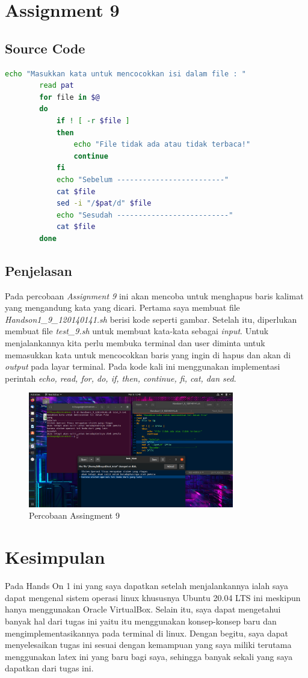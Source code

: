 \documentclass[11pt,a4paper]{article}
\begin{document}
\newpage
\section{Assignment 9}
\subsection*{Source Code}
\begin{lstlisting}[language=bash]
		echo "Masukkan kata untuk mencocokkan isi dalam file : "  
		read pat  
		for file in $@  
		do  
			if ! [ -r $file ]  
			then  
				echo "File tidak ada atau tidak terbaca!"  
				continue  
			fi  
			echo "Sebelum -------------------------"  
			cat $file  
			sed -i "/$pat/d" $file  
			echo "Sesudah --------------------------"  
			cat $file  
		done
\end{lstlisting}

\subsection*{Penjelasan}
	Pada percobaan \textit{Assignment 9} ini akan mencoba untuk menghapus baris kalimat yang mengandung kata yang dicari.
	Pertama saya membuat file \textit{Handson1\_9\_120140141.sh} berisi kode seperti gambar. Setelah itu, diperlukan membuat file \textit{test\_9.sh}
	untuk membuat kata-kata sebagai \textit{input}. Untuk menjalankannya kita perlu membuka terminal dan user diminta untuk memasukkan 
	kata untuk mencocokkan baris yang ingin di hapus dan akan di \textit{output} pada layar terminal. Pada kode kali ini menggunakan 
	implementasi perintah \textit{echo, read, for, do, if, then, continue, fi, cat, dan sed}.
	\begin{figure}
		\centering
		\includegraphics[width=0.8\textwidth]{Figure/assign 9.png}
		\caption{Percobaan Assingment 9}
	\end{figure}

\newpage
\section{Kesimpulan}
	Pada Hands On 1 ini yang saya dapatkan setelah menjalankannya ialah saya dapat mengenal sistem operasi linux
	khususnya Ubuntu 20.04 LTS ini meskipun hanya menggunakan Oracle VirtualBox. Selain itu, saya dapat mengetahui
	banyak hal dari tugas ini yaitu itu menggunakan konsep-konsep baru dan mengimplementasikannya pada terminal di linux.
	Dengan begitu, saya dapat menyelesaikan tugas ini sesuai dengan kemampuan yang saya miliki terutama menggunakan latex
	ini yang baru bagi saya, sehingga banyak sekali yang saya dapatkan dari tugas ini.
		
\end{document}
